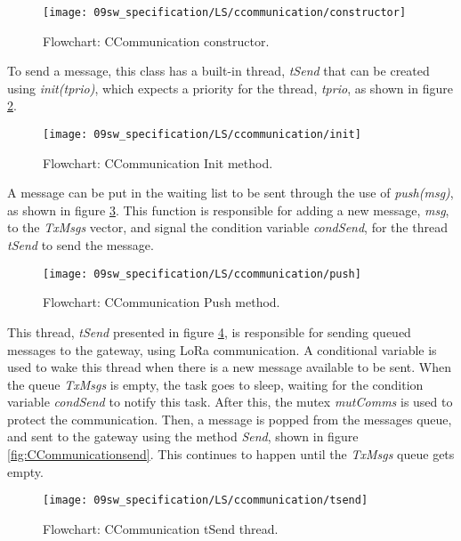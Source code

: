 \begin{figure}[H]
	\centering
	\texttt{[image: 09sw\_specification/LS/ccommunication/constructor]}
	\caption{Flowchart: CCommunication constructor.}
	\label{fig:CCommunicationConstructor}
\end{figure}

To send a message, this class has a built-in thread, \textit{tSend} that can be created using \textit{init(tprio)}, which expects a priority for the thread, \textit{tprio}, as shown in figure \ref{fig:CCommunicationinit}.

\begin{figure}[H]
	\centering
	\texttt{[image: 09sw\_specification/LS/ccommunication/init]}
	\caption{Flowchart: CCommunication Init method.}
	\label{fig:CCommunicationinit}
\end{figure}

A message can be put in the waiting list to be sent through the use of \textit{push(msg)}, as shown in figure \ref{fig:CCommunicationPush}. This function is responsible for adding a new message, \textit{msg}, to the \textit{TxMsgs} vector, and signal the condition variable \textit{condSend}, for the thread \textit{tSend} to send the message.

\begin{figure}[H]
	\centering
	\texttt{[image: 09sw\_specification/LS/ccommunication/push]}
	\caption{Flowchart: CCommunication Push method.}
	\label{fig:CCommunicationPush}
\end{figure}

\clearpage
This thread, \textit{tSend} presented in figure \ref{fig:CCommunicationtsend}, is responsible for sending queued messages to the gateway, using LoRa communication. A conditional variable is used to wake this thread when there is a new message available to be sent. When the queue \textit{TxMsgs} is empty, the task goes to sleep, waiting for the condition variable \textit{condSend} to notify this task. After this, the mutex \textit{mutComms} is used to protect the communication. Then, a message is popped from the messages queue, and sent to the gateway using the method \textit{Send}, shown in figure \ref{fig:CCommunicationsend}. This continues to happen until the \textit{TxMsgs} queue gets empty.

\begin{figure}[H]
	\centering
	\texttt{[image: 09sw\_specification/LS/ccommunication/tsend]}
	\caption{Flowchart: CCommunication tSend thread.}
	\label{fig:CCommunicationtsend}
\end{figure}

